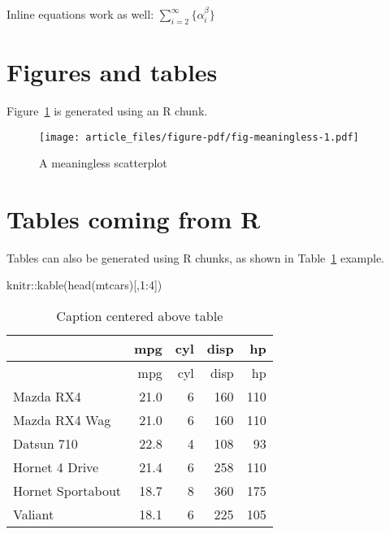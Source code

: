 \documentclass[
  authoryear,
  preprint,
  3p]{elsarticle}
\newenvironment{Shaded}{\begin{snugshade}}{\end{snugshade}}
\newcommand{\DecValTok}[1]{\textcolor[rgb]{0.68,0.00,0.00}{#1}}
\newcommand{\FunctionTok}[1]{\textcolor[rgb]{0.28,0.35,0.67}{#1}}
\newcommand{\NormalTok}[1]{\textcolor[rgb]{0.00,0.23,0.31}{#1}}
\newcommand{\SpecialCharTok}[1]{\textcolor[rgb]{0.37,0.37,0.37}{#1}}
\begin{document}
Inline equations work as well: \(\sum_{i = 2}^\infty\{\alpha_i^\beta\}\)

\hypertarget{figures-and-tables}{%
\section{Figures and tables}\label{figures-and-tables}}

Figure~\ref{fig-meaningless} is generated using an R chunk.

\begin{figure}

{\centering \texttt{[image: article\_files/figure-pdf/fig-meaningless-1.pdf]}

}

\caption{\label{fig-meaningless}A meaningless scatterplot}

\end{figure}

\hypertarget{tables-coming-from-r}{%
\section{Tables coming from R}\label{tables-coming-from-r}}

Tables can also be generated using R chunks, as shown in
Table~\ref{tbl-simple} example.

\begin{Shaded}
\begin{Highlighting}[]
\NormalTok{knitr}\SpecialCharTok{::}\FunctionTok{kable}\NormalTok{(}\FunctionTok{head}\NormalTok{(mtcars)[,}\DecValTok{1}\SpecialCharTok{:}\DecValTok{4}\NormalTok{])}
\end{Highlighting}
\end{Shaded}

\hypertarget{tbl-simple}{}
\begin{longtable}[]{@{}lrrrr@{}}
\caption{\label{tbl-simple}Caption centered above table}\tabularnewline
\toprule()
& mpg & cyl & disp & hp \\
\midrule()
\endfirsthead
\toprule()
& mpg & cyl & disp & hp \\
\midrule()
\endhead
Mazda RX4 & 21.0 & 6 & 160 & 110 \\
Mazda RX4 Wag & 21.0 & 6 & 160 & 110 \\
Datsun 710 & 22.8 & 4 & 108 & 93 \\
Hornet 4 Drive & 21.4 & 6 & 258 & 110 \\
Hornet Sportabout & 18.7 & 8 & 360 & 175 \\
Valiant & 18.1 & 6 & 225 & 105 \\
\bottomrule()
\end{longtable}


\renewcommand\refname{References}
  
\end{document}

